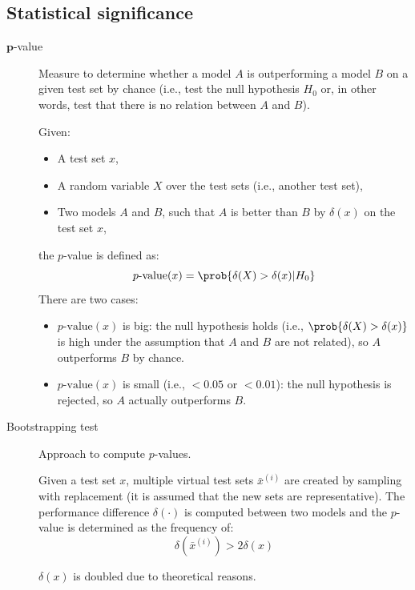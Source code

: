 \subsection{Statistical significance}

\begin{description}
    \item[$\mathbf{p}$-value] 
        Measure to determine whether a model $A$ is outperforming a model $B$ on a given test set by chance (i.e., test the null hypothesis $H_0$ or, in other words, test that there is no relation between $A$ and $B$).

        Given:
        \begin{itemize}
            \item A test set $x$,
            \item A random variable $X$ over the test sets (i.e., another test set),
            \item Two models $A$ and $B$, such that $A$ is better than $B$ by $\delta(x)$ on the test set $x$,
        \end{itemize}
        the $p$-value is defined as:
        \[ p\text{-value}(x) = \prob{\delta(X) > \delta(x) | H_0} \]
        There are two cases:
        \begin{itemize}
            \item $p\text{-value}(x)$ is big: the null hypothesis holds (i.e., $\prob{\delta(X) > \delta(x)}$ is high under the assumption that $A$ and $B$ are not related), so $A$ outperforms $B$ by chance.
            \item $p\text{-value}(x)$ is small (i.e., $< 0.05$ or $< 0.01$): the null hypothesis is rejected, so $A$ actually outperforms $B$.
        \end{itemize}

    \item[Bootstrapping test] 
        Approach to compute $p$-values.

        Given a test set $x$, multiple virtual test sets $\bar{x}^{(i)}$ are created by sampling with replacement (it is assumed that the new sets are representative). The performance difference $\delta(\cdot)$ is computed between two models and the $p$-value is determined as the frequency of:
        \[ \delta(\bar{x}^{(i)}) > 2\delta(x) \]

        \begin{remark}
            $\delta(x)$ is doubled due to theoretical reasons.
        \end{remark}


\end{description}
